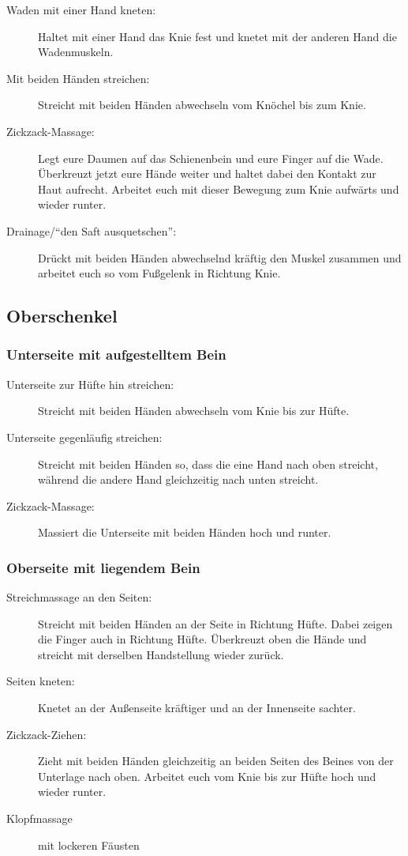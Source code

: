 \begin{description}
  \item [Waden mit einer Hand kneten:] Haltet mit einer Hand das Knie fest und knetet mit der anderen Hand die Wadenmuskeln.
  \item [Mit beiden Händen streichen:] Streicht mit beiden Händen abwechseln vom Knöchel bis zum Knie.
  \item [Zickzack-Massage:] Legt eure Daumen auf das Schienenbein und eure Finger auf die Wade. Überkreuzt jetzt eure Hände weiter und haltet dabei den Kontakt zur Haut aufrecht. Arbeitet euch mit dieser Bewegung zum Knie aufwärts und wieder runter.
  \item [Drainage/"`den Saft ausquetschen"':] Drückt mit beiden Händen abwechselnd kräftig den Muskel zusammen und arbeitet euch so vom Fußgelenk in Richtung Knie.
\end{description}

\subsection{Oberschenkel}

\subsubsection{Unterseite mit aufgestelltem Bein}

\begin{description}
  \item [Unterseite zur Hüfte hin streichen:] Streicht mit beiden Händen abwechseln vom Knie bis zur Hüfte.
  \item [Unterseite gegenläufig streichen:] Streicht mit beiden Händen so, dass die eine Hand nach oben streicht, während die andere Hand gleichzeitig nach unten streicht.
  \item [Zickzack-Massage:] Massiert die Unterseite mit beiden Händen hoch und runter.
\end{description}

\subsubsection{Oberseite mit liegendem Bein}

\begin{description}
  \item [Streichmassage an den Seiten:] Streicht mit beiden Händen an der Seite in Richtung Hüfte. Dabei zeigen die Finger auch in Richtung Hüfte. Überkreuzt oben die Hände und streicht mit derselben Handstellung wieder zurück.
  \item [Seiten kneten:] Knetet an der Außenseite kräftiger und an der Innenseite sachter.
  \item [Zickzack-Ziehen:] Zieht mit beiden Händen gleichzeitig an beiden Seiten des Beines von der Unterlage nach oben. Arbeitet euch vom Knie bis zur Hüfte hoch und wieder runter.
  \item [Klopfmassage] mit lockeren Fäusten
\end{description}


